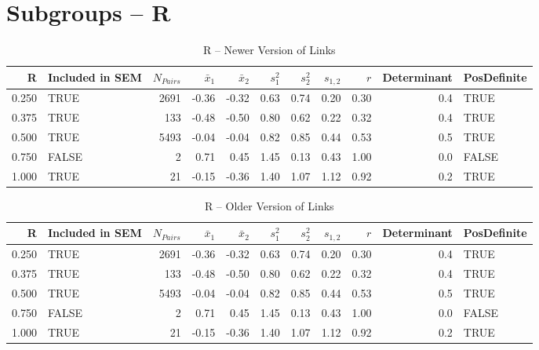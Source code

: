 \documentclass{article}\usepackage[]{graphicx}\usepackage[]{color}
\begin{document}
\section{Subgroups --  R }%
\begin{table}[ht]
\centering
\begin{tabular}{rlrrrrrrrrl}
  \hline
R & Included in SEM & $N_{Pairs}$ & $\bar{x}_1$ & $\bar{x}_2$ & $s_1^2$ & $s_2^2$ & $s_{1,2}$ & $r$ & Determinant & PosDefinite \\ 
  \hline
0.250 & TRUE & 2691 & -0.36 & -0.32 & 0.63 & 0.74 & 0.20 & 0.30 & 0.4 & TRUE \\ 
  0.375 & TRUE & 133 & -0.48 & -0.50 & 0.80 & 0.62 & 0.22 & 0.32 & 0.4 & TRUE \\ 
  0.500 & TRUE & 5493 & -0.04 & -0.04 & 0.82 & 0.85 & 0.44 & 0.53 & 0.5 & TRUE \\ 
  0.750 & FALSE & 2 & 0.71 & 0.45 & 1.45 & 0.13 & 0.43 & 1.00 & 0.0 & FALSE \\ 
  1.000 & TRUE & 21 & -0.15 & -0.36 & 1.40 & 1.07 & 1.12 & 0.92 & 0.2 & TRUE \\ 
   \hline
\end{tabular}
\caption{R -- Newer Version of Links} 
\end{table}
\begin{table}[ht]
\centering
\begin{tabular}{rlrrrrrrrrl}
  \hline
R & Included in SEM & $N_{Pairs}$ & $\bar{x}_1$ & $\bar{x}_2$ & $s_1^2$ & $s_2^2$ & $s_{1,2}$ & $r$ & Determinant & PosDefinite \\ 
  \hline
0.250 & TRUE & 2691 & -0.36 & -0.32 & 0.63 & 0.74 & 0.20 & 0.30 & 0.4 & TRUE \\ 
  0.375 & TRUE & 133 & -0.48 & -0.50 & 0.80 & 0.62 & 0.22 & 0.32 & 0.4 & TRUE \\ 
  0.500 & TRUE & 5493 & -0.04 & -0.04 & 0.82 & 0.85 & 0.44 & 0.53 & 0.5 & TRUE \\ 
  0.750 & FALSE & 2 & 0.71 & 0.45 & 1.45 & 0.13 & 0.43 & 1.00 & 0.0 & FALSE \\ 
  1.000 & TRUE & 21 & -0.15 & -0.36 & 1.40 & 1.07 & 1.12 & 0.92 & 0.2 & TRUE \\ 
   \hline
\end{tabular}
\caption{R -- Older Version of Links} 
\end{table}
\newpage 
\end{document}
